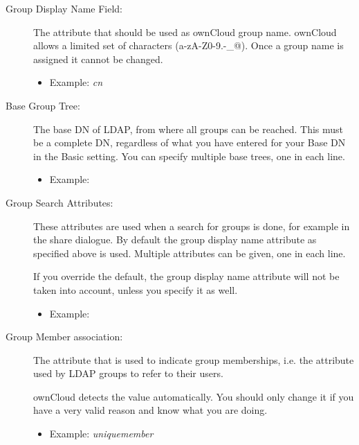 \documentclass[letterpaper,10pt,english]{sphinxmanual}
\begin{document}
\begin{description}
\begin{itemize}
\end{itemize}

\item[{Group Display Name Field:}] \leavevmode
The attribute that should be used as ownCloud group name. ownCloud allows a
limited set of characters (a-zA-Z0-9.-\_@). Once a group name is assigned it
cannot be changed.
\begin{itemize}
\item {} 
Example: \emph{cn}

\end{itemize}

\item[{Base Group Tree:}] \leavevmode
The base DN of LDAP, from where all groups can be reached. This must be a
complete DN, regardless of what you have entered for your Base DN in the
Basic setting. You can specify multiple base trees, one in each line.
\begin{itemize}
\item {} 
Example:


\end{itemize}

\item[{Group Search Attributes:}] \leavevmode
These attributes are used when a search for groups is done, for example in
the share dialogue. By default the group display name attribute as specified
above is used. Multiple attributes can be given, one in each line.

If you override the default, the group display name attribute will not be
taken into account, unless you specify it as well.
\begin{itemize}
\item {} 
Example:


\end{itemize}

\item[{Group Member association:}] \leavevmode
The attribute that is used to indicate group memberships, i.e. the attribute
used by LDAP groups to refer to their users.

ownCloud detects the value automatically. You should only change it if you
have a very valid reason and know what you are doing.
\begin{itemize}
\item {} 
Example: \emph{uniquemember}

\end{itemize}

\end{description}
\end{document}

